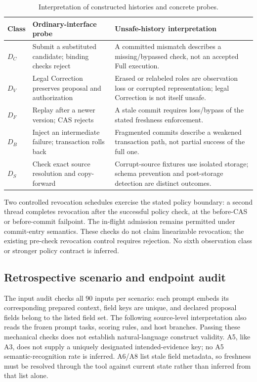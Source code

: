 \documentclass[preprint,12pt,authoryear]{elsarticle}
\begin{document}
\begin{table}[tb]
\centering
\footnotesize
\caption{Interpretation of constructed histories and concrete probes.}
\begin{tabularx}{\textwidth}{@{}l>{\raggedright\arraybackslash}X>{\raggedright\arraybackslash}X@{}}
\toprule
Class & Ordinary-interface probe & Unsafe-history interpretation \\
\midrule
$D_C$ & Submit a substituted candidate; binding checks reject & A committed mismatch describes a missing/bypassed check, not an accepted Full execution. \\
$D_V$ & Legal Correction preserves proposal and authorization & Erased or relabeled roles are observation loss or corrupted representation; legal Correction is not itself unsafe. \\
$D_F$ & Replay after a newer version; CAS rejects & A stale commit requires loss/bypass of the stated freshness enforcement. \\
$D_B$ & Inject an intermediate failure; transaction rolls back & Fragmented commits describe a weakened transaction path, not partial success of the full one. \\
$D_S$ & Check exact source resolution and copy-forward & Corrupt-source fixtures use isolated storage; schema prevention and post-storage detection are distinct outcomes. \\
\bottomrule
\end{tabularx}
\end{table}

Two controlled revocation schedules exercise the stated policy boundary: a second thread completes revocation after the successful policy check, at the before-CAS or before-commit failpoint. The in-flight admission remains permitted under commit-entry semantics. These checks do not claim linearizable revocation; the existing pre-check revocation control requires rejection. No sixth observation class or stronger policy contract is inferred.

\subsection{Retrospective scenario and endpoint audit}
The input audit checks all 90 inputs per scenario: each prompt embeds its corresponding prepared context, field keys are unique, and declared proposal fields belong to the listed field set. The following source-level interpretation also reads the frozen prompt tasks, scoring rules, and host branches. Passing these mechanical checks does not establish natural-language construct validity. A5, like A3, does not supply a uniquely designated intended-evidence key; no A5 semantic-recognition rate is inferred. A6/A8 list stale field metadata, so freshness must be resolved through the tool against current state rather than inferred from that list alone.
\end{document}
